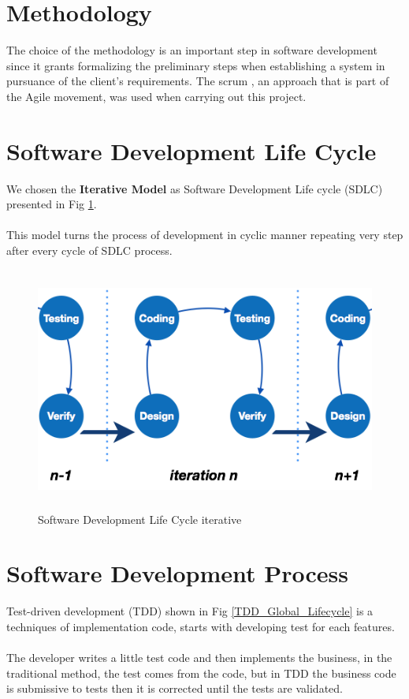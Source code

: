 	\section{Methodology}
	The choice of the methodology is an important step in software development since it grants formalizing the preliminary steps when establishing a system in pursuance of the client’s requirements.
	The scrum , an approach that is part of the Agile movement, was used when carrying out this project.
	
	\section{Software Development Life Cycle}
	We chosen the \textbf{Iterative Model }as Software Development Life cycle (SDLC) presented in Fig \ref{sdlc_iterative}.
	\\
	\\
	This model turns the process of development in cyclic manner repeating very step after every cycle of SDLC process.  
	
	\begin{figure}[h]
		\centering
		\includegraphics[width=14cm,height=8cm]{sdlc_iterative.png}
		\caption[Software Development Life Cycle iterative]{Software Development Life Cycle iterative \cite{ref4} }
		\label{sdlc_iterative}	
	\end{figure}  

	\section{Software Development Process}
	Test-driven development (TDD) shown in Fig \ref{TDD_Global_Lifecycle} is a techniques of implementation code, starts with developing test for each features. 
	\\
	\\
	The developer writes a little test code and then implements the business, in the traditional method, the test comes from the code, but in TDD the business code is submissive to tests then it is corrected until the tests are validated. 
	
